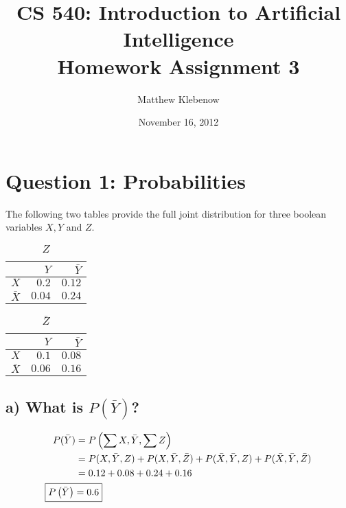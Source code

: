 \documentclass[12pt,letterpaper]{article}
\author{Matthew Klebenow}
\title{CS 540: Introduction to Artificial Intelligence \\ Homework Assignment 3}
\date{November 16, 2012}
\begin{document}
\maketitle
\tableofcontents
\pagebreak
\section{Question 1: Probabilities}
The following two tables provide the full joint distribution for three boolean variables $X,Y$ and $Z$.
\begin{table}[htbp]
  \centering
  \caption{$Z$}
    \begin{tabular}{rrr}
    \toprule
          & $Y$     & $\bar{Y}$ \\
    \midrule
    $X$     & $0.2$   & $0.12$ \\
    $\bar{X}$ & $0.04$  & $0.24$ \\
    \bottomrule
    \end{tabular}%
  \label{tab:ztable}%
\end{table}%
\begin{table}[htbp]
  \centering
  \caption{$\bar{Z}$}
    \begin{tabular}{rrr}
    \toprule
          & $Y$     & $\bar{Y}$ \\
    \midrule
    $X$     & $0.1$   & $0.08$ \\
    $\bar{X}$ & $0.06$  & $0.16$ \\
    \bottomrule
    \end{tabular}%
  \label{tab:notztable}%
\end{table}%
\subsection{a) What is $P\left(\bar{Y}\right)$?}
\begin{align*}
P(\bar{Y}) &= P\left(\sum{X},\bar{Y},\sum{Z}\right)\\
&= P(X,\bar{Y},Z) + P(X,\bar{Y},\bar{Z}) + P(\bar{X},\bar{Y},Z) + P(\bar{X},\bar{Y},\bar{Z})\\
&= 0.12 + 0.08 + 0.24 + 0.16\\
\Aboxed{P\left(\bar{Y}\right) &= 0.6}
%
\end{align*}
\end{document}
